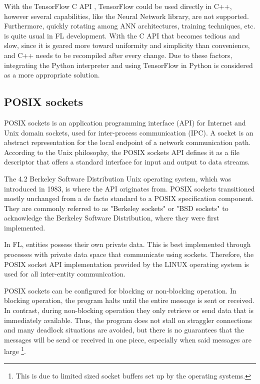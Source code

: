 With the TensorFlow C API \cite{TF_C_API}, TensorFlow could be used directly in C++, however several capabilities, like the Neural Network library, are not supported. Furthermore, quickly rotating among ANN architectures, training techniques, etc. is quite usual in FL development. With the C API that becomes tedious and slow, since it is geared more toward uniformity and simplicity than convenience, and C++ needs to be recompiled after every change. Due to these factors, integrating the Python interpreter and using TensorFlow in Python is considered as a more appropriate solution.

\subsection{POSIX sockets}
POSIX sockets \cite{POSIX_socket} is an application programming interface (API) for Internet and Unix domain sockets, used for inter-process communication (IPC). A socket is an abstract representation for the local endpoint of a network communication path. According to the Unix philosophy, the POSIX sockets API defines it as a file descriptor that offers a standard interface for input and output to data streams.

The 4.2 Berkeley Software Distribution \cite{bsd} Unix operating system, which was introduced in 1983, is where the API originates from. POSIX sockets transitioned mostly unchanged from a de facto standard to a POSIX specification component. They are commonly referred to as "Berkeley sockets" or "BSD sockets" to acknowledge the Berkeley Software Distribution, where they were first implemented.
 
In FL, entities possess their own private data. This is best implemented through processes with private data space that communicate using sockets. Therefore, the POSIX socket API implementation provided by the LINUX operating system is used for all inter-entity communication. 

POSIX sockets can be configured for blocking or non-blocking operation. In blocking operation, the program halts until the entire message is sent or received. In contrast, during non-blocking operation they only retrieve or send data that is immediately available. Thus, the program does not stall on straggler connections and many deadlock situations are avoided, but there is no guarantees that the messages will be send or received in one piece, especially when said messages are large \footnote{This is due to limited sized socket buffers set up by the operating systems.}.

